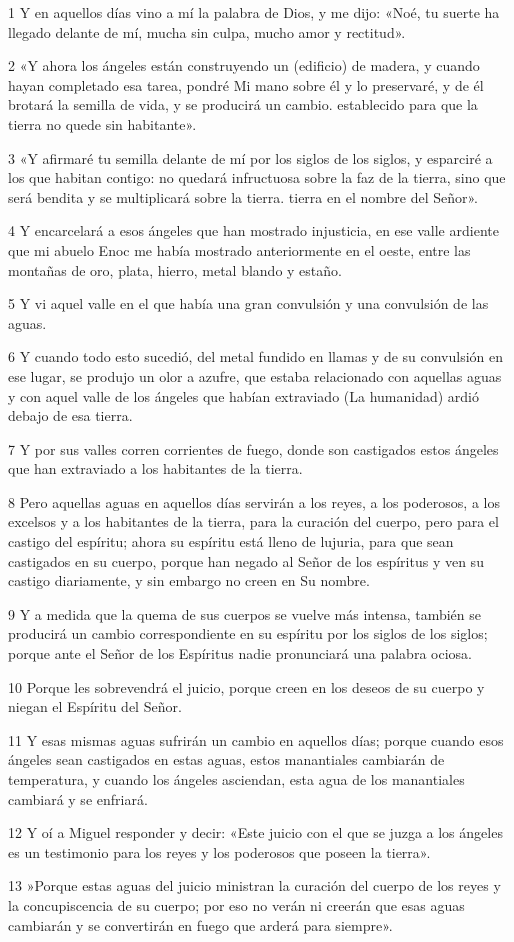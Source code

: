 \par 1 Y en aquellos días vino a mí la palabra de Dios, y me dijo: «Noé, tu suerte ha llegado delante de mí, mucha sin culpa, mucho amor y rectitud».
\par 2 «Y ahora los ángeles están construyendo un (edificio) de madera, y cuando hayan completado esa tarea, pondré Mi mano sobre él y lo preservaré, y de él brotará la semilla de vida, y se producirá un cambio. establecido para que la tierra no quede sin habitante».
\par 3 «Y afirmaré tu semilla delante de mí por los siglos de los siglos, y esparciré a los que habitan contigo: no quedará infructuosa sobre la faz de la tierra, sino que será bendita y se multiplicará sobre la tierra. tierra en el nombre del Señor».
\par 4 Y encarcelará a esos ángeles que han mostrado injusticia, en ese valle ardiente que mi abuelo Enoc me había mostrado anteriormente en el oeste, entre las montañas de oro, plata, hierro, metal blando y estaño.
\par 5 Y vi aquel valle en el que había una gran convulsión y una convulsión de las aguas.
\par 6 Y cuando todo esto sucedió, del metal fundido en llamas y de su convulsión en ese lugar, se produjo un olor a azufre, que estaba relacionado con aquellas aguas y con aquel valle de los ángeles que habían extraviado (La humanidad) ardió debajo de esa tierra.
\par 7 Y por sus valles corren corrientes de fuego, donde son castigados estos ángeles que han extraviado a los habitantes de la tierra.
\par 8 Pero aquellas aguas en aquellos días servirán a los reyes, a los poderosos, a los excelsos y a los habitantes de la tierra, para la curación del cuerpo, pero para el castigo del espíritu; ahora su espíritu está lleno de lujuria, para que sean castigados en su cuerpo, porque han negado al Señor de los espíritus y ven su castigo diariamente, y sin embargo no creen en Su nombre.
\par 9 Y a medida que la quema de sus cuerpos se vuelve más intensa, también se producirá un cambio correspondiente en su espíritu por los siglos de los siglos; porque ante el Señor de los Espíritus nadie pronunciará una palabra ociosa.
\par 10 Porque les sobrevendrá el juicio, porque creen en los deseos de su cuerpo y niegan el Espíritu del Señor.
\par 11 Y esas mismas aguas sufrirán un cambio en aquellos días; porque cuando esos ángeles sean castigados en estas aguas, estos manantiales cambiarán de temperatura, y cuando los ángeles asciendan, esta agua de los manantiales cambiará y se enfriará.
\par 12 Y oí a Miguel responder y decir: «Este juicio con el que se juzga a los ángeles es un testimonio para los reyes y los poderosos que poseen la tierra».
\par 13 »Porque estas aguas del juicio ministran la curación del cuerpo de los reyes y la concupiscencia de su cuerpo; por eso no verán ni creerán que esas aguas cambiarán y se convertirán en fuego que arderá para siempre».

